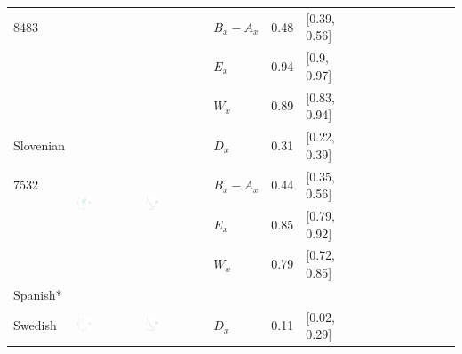 \documentclass[11pt,letterpaper]{article}
\begin{document}
\begin{longtable}{lllllllllllllll}
8483  &    &    &  $B_x-A_x$  &  0.48  &  [0.39, 0.56]  \\ 
  &    &    &  $E_x$  &  0.94  &  [0.9, 0.97]  \\ 
  &    &    &  $W_x$  &  0.89  &  [0.83, 0.94]  \\ [10.25ex] \hline
Slovenian  &  \multirow{4}{*}{\includegraphics[width=0.25\textwidth]{figures/Slovenian-entropy-memory.pdf}}  &  \multirow{4}{*}{\includegraphics[width=0.25\textwidth]{figures/Slovenian-listener-surprisal-memory.pdf}}  &  $D_x$  &  0.31  &  [0.22, 0.39]  \\ 
7532  &    &    &  $B_x-A_x$  &  0.44  &  [0.35, 0.56]  \\ 
  &    &    &  $E_x$  &  0.85  &  [0.79, 0.92]  \\ 
  &    &    &  $W_x$  &  0.79  &  [0.72, 0.85]  \\ [10.25ex] \hline
Spanish* &\\ [10.25ex] \hline
Swedish  &  \multirow{4}{*}{\includegraphics[width=0.25\textwidth]{figures/Swedish-entropy-memory.pdf}}  &  \multirow{4}{*}{\includegraphics[width=0.25\textwidth]{figures/Swedish-listener-surprisal-memory.pdf}}  &  $D_x$  &  0.11  &  [0.02, 0.29]  \\ 

\end{longtable}
\end{document}

